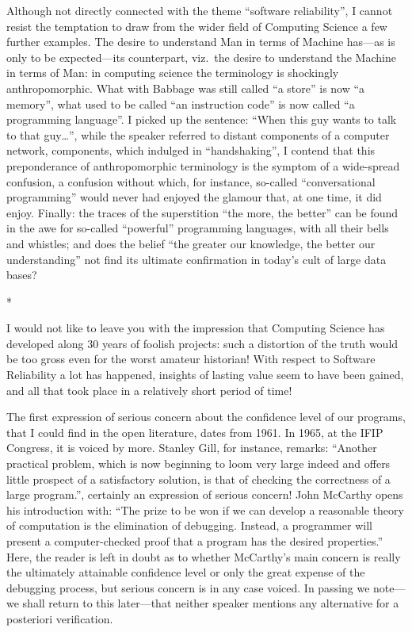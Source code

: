 \documentclass[12pt,letterpaper]{article}
\newcommand{\acro}[1]{{\small\MakeUppercase{#1}\spacefactor1000}}
\newcommand{\stardiv}{\medskip\centerline{*\qquad\raisebox{-1ex}{*}\qquad*}\medskip\noindent\ignorespaces}
\begin{document}
Although not directly connected with the theme ``software reliability'', I
cannot resist the temptation to draw from the wider field of Computing Science
a few further examples. The desire to understand Man in terms of Machine
has---as is only to be expected---its counterpart, viz.~the desire to
understand the Machine in terms of Man: in computing science the terminology is
shockingly anthropomorphic. What with Babbage was still called ``a store'' is
now ``a memory'', what used to be called ``an instruction code'' is now called
``a programming language''. I picked up the sentence: ``When this guy wants to
talk to that guy\ldots'', while the speaker referred to distant components of a
computer network, components, which indulged in ``handshaking'', I contend that
this preponderance of anthropomorphic terminology is the symptom of a
wide-spread confusion, a confusion without which, for instance, so-called
``conversational programming'' would never had enjoyed the glamour that, at one
time, it did enjoy. Finally: the traces of the superstition ``the more, the
better'' can be found in the awe for so-called ``powerful'' programming
languages, with all their bells and whistles; and does the belief ``the greater
our knowledge, the better our understanding'' not find its ultimate
confirmation in today's cult of large data bases? 

\stardiv

I would not like to leave you with the impression that Computing Science has developed 
along 30 years of foolish projects: such a distortion of the truth would be too gross even for 
the worst amateur historian! With respect to Software Reliability a lot has happened, insights of 
lasting value seem to have been gained, and all 
that took place in a relatively short period of 
time! 

The first expression of serious concern about the confidence level of our
programs, that I could find in the open literature, dates from 1961. In 1965,
at the \acro{IFIP} Congress, it is voiced by more. Stanley Gill, for instance,
remarks: ``Another practical problem, which is now beginning to loom very large
indeed and offers little prospect of a satisfactory solution, is that of
checking the correctness of a large program.'', certainly an expression of
serious concern! John McCarthy opens his introduction with: ``The prize to be
won if we can develop a reasonable theory of computation is the elimination of
debugging. Instead, a programmer will present a computer-checked proof that a
program has the desired properties.'' Here, the reader is left in doubt as to
whether McCarthy's main concern is really the ultimately attainable confidence
level or only the great expense of the debugging process, but serious concern
is in any case voiced. In passing we note---we shall return to this
later---that neither speaker mentions any alternative for a posteriori
verification. 
\end{document}
